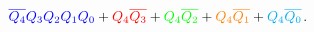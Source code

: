 \begin{figure}[H]
  \begin{subfigure}{0.5\textwidth}
    \centering
  \end{subfigure}
  \begin{subfigure}{.4\textwidth}
    \centering
  \end{subfigure}
  \centering
  \caption*{$
  \color{blue} \overline{Q_4} Q_3 Q_2 Q_1 Q_0
  \color{black} +
  \color{red} Q_4 \overline{Q_3}
  \color{black} +
  \color{green} Q_4 \overline{Q_2}
  \color{black} +
  \color{orange} Q_4 \overline{Q_1}
  \color{black} +
  \color{cyan} Q_4 \overline{Q_0}
  $.}
\end{figure}
